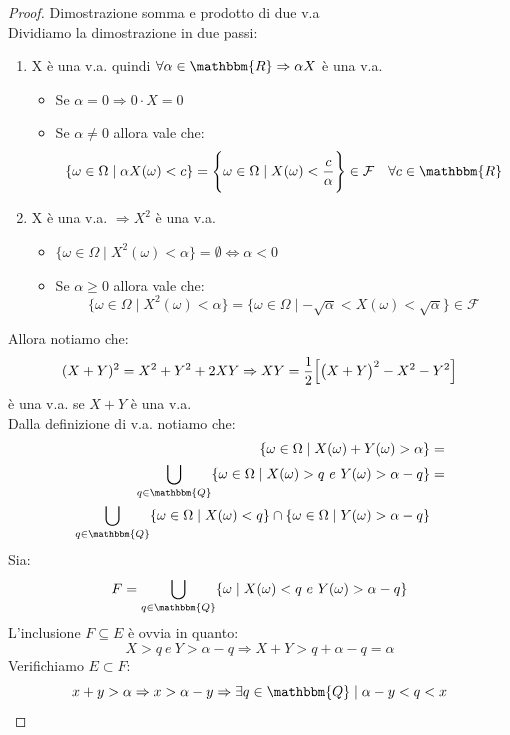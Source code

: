 \documentclass[12pt]{report}
\begin{document}
 	\begin{proof}{Dimostrazione somma e prodotto di due v.a} \quad \\
 		Dividiamo la dimostrazione in due passi:
 		\begin{enumerate}
 			\item X è una v.a. quindi $\forall \alpha \in \mathbbm{R} \Rightarrow \alpha X$ è una v.a. \\
 			\begin{itemize}
 				\item Se $\alpha = 0 \Rightarrow 0 \cdot X = 0$
 				\item Se $\alpha \neq 0$ allora vale che:
 				\[
 				\{\omega \in \Omega \mid \alpha X(\omega) < c\} = \Bigg\{\omega \in \Omega \mid X(\omega) < \frac{c}{\alpha}\Bigg\} \in \mathcal{F} \quad \forall c \in \mathbbm{R}
 				\]
 			\end{itemize}
 			\item X è una v.a. $\Rightarrow X^2$ è una v.a.
 			\begin{itemize}
 				\item $\{\omega \in \Omega \mid X^2(\omega) < \alpha\} = \emptyset \iff \alpha < 0$
 				\item Se $\alpha \geq 0$ allora vale che:
 				\[
 				\{\omega \in \Omega \mid X^2(\omega) < \alpha\} = \{\omega \in \Omega \mid -\sqrt{\alpha} < X(\omega) < \sqrt{\alpha}\} \in \mathcal{F}
 				\]
 			\end{itemize}

 		\end{enumerate}
 		Allora notiamo che:
 		\[
 		(X + Y)^2 = X^2 + Y^2 + 2XY \Rightarrow XY = \frac{1}{2}\Bigl[\bigl(X+Y\bigr)^2 - X^2 - Y^2\Bigr]
 		\]
 		è una v.a. se $X + Y$ è una v.a. \\
 		Dalla definizione di v.a. notiamo che:
 		\begin{align*}
 		\{\omega \in \Omega \mid X(\omega) + Y(\omega) > \alpha\} &= \\ \bigcup_{q \in \mathbbm{Q}}\{\omega \in \Omega \mid X(\omega) > q \ e \ Y(\omega) > \alpha - q\} &= \\ \bigcup_{q \in \mathbbm{Q}} \{\omega \in \Omega \mid X(\omega) < q\} \cap \{\omega \in \Omega \mid Y(\omega) > \alpha - q\}
 		\end{align*}
 		Sia:
 		\[F = \bigcup_{q\in \mathbbm{Q}}\{\omega \mid X(\omega) < q \ e \ Y(\omega) > \alpha - q\}\]
 		L'inclusione $F \subseteq E$ è ovvia in quanto: \[X > q \ e \ Y > \alpha - q \Rightarrow X+ Y > q + \alpha - q = \alpha\]
 		Verifichiamo $E \subset F$:
 		\[x + y > \alpha \Rightarrow x > \alpha - y \Rightarrow \exists q \in \mathbbm{Q} \mid \alpha - y < q < x
 		\]
 	\end{proof}
\end{document}
